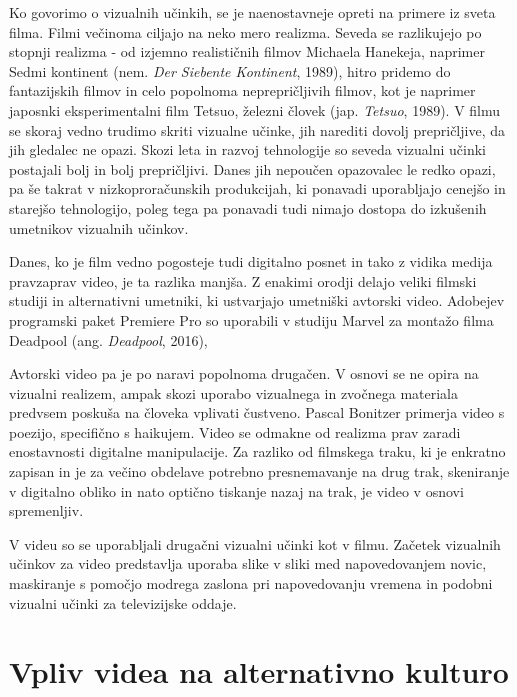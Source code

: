 \documentclass[a4paper, 12pt]{book}
\begin{document}
Ko govorimo o vizualnih učinkih, se je naenostavneje opreti na primere iz sveta filma.
Filmi večinoma ciljajo na neko mero realizma.
Seveda se razlikujejo po stopnji realizma - od izjemno realističnih filmov Michaela Hanekeja, naprimer Sedmi kontinent (nem. {\it Der Siebente Kontinent}, 1989), 
hitro pridemo do fantazijskih filmov in celo popolnoma neprepričljivih filmov, kot je naprimer japosnki eksperimentalni film Tetsuo, železni človek (jap. {\it Tetsuo}, 1989). 
V filmu se skoraj vedno trudimo skriti vizualne učinke, jih narediti dovolj prepričljive, da jih gledalec ne opazi.
Skozi leta in razvoj tehnologije so seveda vizualni učinki postajali bolj in bolj prepričljivi.
Danes jih nepoučen opazovalec le redko opazi, pa še takrat v nizkoproračunskih produkcijah, ki ponavadi uporabljajo cenejšo in starejšo tehnologijo, poleg tega pa ponavadi tudi nimajo dostopa do izkušenih umetnikov vizualnih učinkov.

Danes, ko je film vedno pogosteje tudi digitalno posnet in tako z vidika medija pravzaprav video, je ta razlika manjša.
Z enakimi orodji delajo veliki filmski studiji in alternativni umetniki, ki ustvarjajo umetniški avtorski video.
Adobejev programski paket Premiere Pro so uporabili v studiju Marvel za montažo filma Deadpool (ang. {\it Deadpool}, 2016), %


Avtorski video pa je po naravi popolnoma drugačen.
V osnovi se ne opira na vizualni realizem, ampak skozi uporabo vizualnega in zvočnega materiala predvsem poskuša na človeka vplivati čustveno\cite{slepoPolje}.
Pascal Bonitzer primerja video s poezijo, specifično s haikujem.
Video se odmakne od realizma prav zaradi enostavnosti digitalne manipulacije.
Za razliko od filmskega traku, ki je enkratno zapisan in je za večino obdelave potrebno presnemavanje na drug trak, skeniranje v digitalno obliko in nato optično tiskanje nazaj na trak,
je video v osnovi spremenljiv.

V videu so se uporabljali drugačni vizualni učinki kot v filmu.
Začetek vizualnih učinkov za video predstavlja uporaba slike v sliki med napovedovanjem novic, maskiranje s pomočjo modrega zaslona pri napovedovanju vremena in podobni vizualni učinki za televizijske oddaje.



\section{Vpliv videa na alternativno kulturo}
\end{document}
